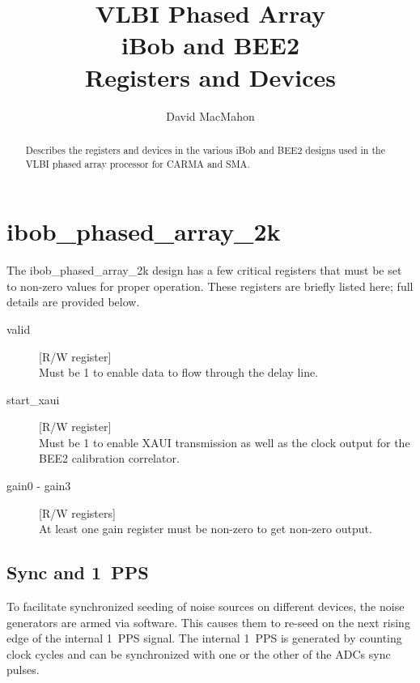 \documentclass[12pt]{article}
\author{David MacMahon}
\title{VLBI Phased Array \\ iBob and BEE2 \\ Registers and Devices}
\begin{document}
\maketitle
\setlength{\parindent}{0pt}
\setlength{\parskip}{1ex plus 0.5ex minus 0.2ex}
\setlength{\itemseporig}{\itemsep}

\newcommand{\tighten}{
  \setlength{\itemsep}{-\parskip}
}
\newcommand{\loosen}{
  \setlength{\itemsep}{\itemseporig}
}
\newcommand{\LSB}{least significant byte }
\newcommand{\LSb}{least significant bit }
\newcommand{\LSbs}{least significant bits }
\newcommand{\devitem}[2]{\item[#1] [#2] \\ }
\newcommand{\rwreg}[1]{\devitem{#1}{R/W register}}
\newcommand{\rwregn}[1]{\item[#1] {} \tighten} %
\newcommand{\rwregs}[1]{\devitem{#1}{R/W registers} \loosen} %
\newcommand{\roreg}[1]{\devitem{#1}{R register}}
\newcommand{\roregn}[1]{\item[#1] {} \tighten} %
\newcommand{\roregs}[1]{\devitem{#1}{R registers} \loosen} %
\newcommand{\degree}[1]{$#1^{\circ}$}

\begin{abstract}
Describes the registers and devices in the various iBob and BEE2 designs used
in the VLBI phased array processor for CARMA and SMA.
\end{abstract}

\section{ibob\_phased\_array\_2k}

The ibob\_phased\_array\_2k design has a few critical registers that must be
set to non-zero values for proper operation.  These registers are briefly
listed here; full details are provided below.

\begin{description}
\rwreg{valid} Must be 1 to enable data to flow through the delay line.
\rwreg{start\_xaui} Must be 1 to enable XAUI transmission as well as the clock
output for the BEE2 calibration correlator.
\rwregs{gain0 - gain3} At least one gain register must be non-zero to get
non-zero output.
\end{description}

  \subsection{Sync and 1~PPS}
To facilitate synchronized seeding of noise sources on different devices, the
noise generators are armed via software.  This causes them to re-seed on the
next rising edge of the internal 1~PPS signal.  The internal 1~PPS is generated
by counting clock cycles and can be synchronized with one or the other of the
ADCs sync pulses.
\end{document}

